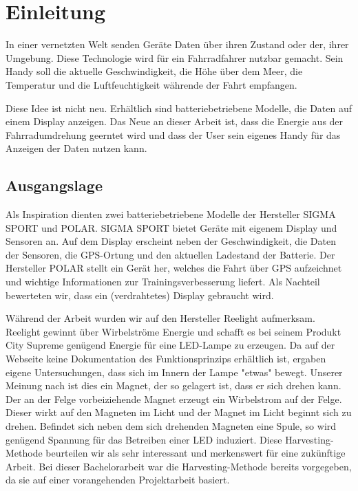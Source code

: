 \chapter{Einleitung}

In einer vernetzten Welt senden Geräte Daten über ihren Zustand oder der, ihrer Umgebung. Diese Technologie wird für ein Fahrradfahrer nutzbar gemacht. Sein Handy soll die aktuelle Geschwindigkeit, die Höhe über dem Meer, die Temperatur und die Luftfeuchtigkeit währende der Fahrt empfangen.

Diese Idee ist nicht neu. Erhältlich sind batteriebetriebene Modelle, die Daten auf einem Display anzeigen. Das Neue an dieser Arbeit ist, dass die Energie aus der Fahrradumdrehung geerntet wird und dass der User sein eigenes Handy für das Anzeigen der Daten nutzen kann.


\section{Ausgangslage}

Als Inspiration dienten zwei batteriebetriebene Modelle der Hersteller SIGMA SPORT und POLAR. SIGMA SPORT bietet Geräte mit eigenem Display und  Sensoren an. Auf dem Display erscheint neben der Geschwindigkeit, die Daten der Sensoren, die GPS-Ortung und den aktuellen Ladestand der Batterie. Der Hersteller POLAR stellt ein Gerät her, welches die Fahrt über GPS aufzeichnet und wichtige Informationen zur Trainingsverbesserung liefert. Als Nachteil bewerteten wir, dass ein (verdrahtetes) Display gebraucht wird.

Während der Arbeit wurden wir auf den Hersteller Reelight aufmerksam. Reelight gewinnt über Wirbelströme Energie und schafft es bei seinem Produkt City Supreme genügend Energie für eine LED-Lampe zu erzeugen. Da auf der Webseite keine Dokumentation des Funktionsprinzips erhältlich ist, ergaben eigene Untersuchungen, dass sich im Innern der Lampe "etwas" bewegt. Unserer Meinung nach ist dies ein Magnet, der so gelagert ist, dass er sich drehen kann. Der an der Felge vorbeiziehende Magnet erzeugt ein Wirbelstrom auf der Felge. Dieser wirkt auf den Magneten im Licht und der Magnet im Licht beginnt sich zu drehen. Befindet sich neben dem sich drehenden Magneten eine Spule, so wird genügend Spannung für das Betreiben einer LED induziert. Diese Harvesting-Methode beurteilen wir als sehr interessant und merkenswert für eine zukünftige Arbeit. Bei dieser Bachelorarbeit war die Harvesting-Methode bereits vorgegeben, da sie auf einer vorangehenden Projektarbeit basiert.

